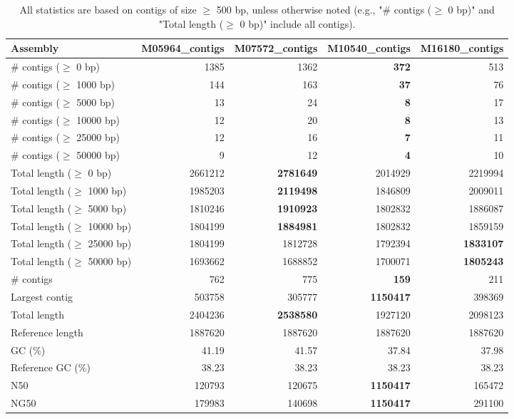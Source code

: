 \documentclass[12pt,a4paper]{article}
\begin{document}
\begin{table}[ht]
\begin{center}
\caption{All statistics are based on contigs of size $\geq$ 500 bp, unless otherwise noted (e.g., "\# contigs ($\geq$ 0 bp)" and "Total length ($\geq$ 0 bp)" include all contigs).}
\begin{tabular}{|l*{4}{|r}|}
\hline
Assembly & M05964\_contigs & M07572\_contigs & M10540\_contigs & M16180\_contigs \\ \hline
\# contigs ($\geq$ 0 bp) & 1385 & 1362 & {\bf 372} & 513 \\ \hline
\# contigs ($\geq$ 1000 bp) & 144 & 163 & {\bf 37} & 76 \\ \hline
\# contigs ($\geq$ 5000 bp) & 13 & 24 & {\bf 8} & 17 \\ \hline
\# contigs ($\geq$ 10000 bp) & 12 & 20 & {\bf 8} & 13 \\ \hline
\# contigs ($\geq$ 25000 bp) & 12 & 16 & {\bf 7} & 11 \\ \hline
\# contigs ($\geq$ 50000 bp) & 9 & 12 & {\bf 4} & 10 \\ \hline
Total length ($\geq$ 0 bp) & 2661212 & {\bf 2781649} & 2014929 & 2219994 \\ \hline
Total length ($\geq$ 1000 bp) & 1985203 & {\bf 2119498} & 1846809 & 2009011 \\ \hline
Total length ($\geq$ 5000 bp) & 1810246 & {\bf 1910923} & 1802832 & 1886087 \\ \hline
Total length ($\geq$ 10000 bp) & 1804199 & {\bf 1884981} & 1802832 & 1859159 \\ \hline
Total length ($\geq$ 25000 bp) & 1804199 & 1812728 & 1792394 & {\bf 1833107} \\ \hline
Total length ($\geq$ 50000 bp) & 1693662 & 1688852 & 1700071 & {\bf 1805243} \\ \hline
\# contigs & 762 & 775 & {\bf 159} & 211 \\ \hline
Largest contig & 503758 & 305777 & {\bf 1150417} & 398369 \\ \hline
Total length & 2404236 & {\bf 2538580} & 1927120 & 2098123 \\ \hline
Reference length & 1887620 & 1887620 & 1887620 & 1887620 \\ \hline
GC (\%) & 41.19 & 41.57 & 37.84 & 37.98 \\ \hline
Reference GC (\%) & 38.23 & 38.23 & 38.23 & 38.23 \\ \hline
N50 & 120793 & 120675 & {\bf 1150417} & 165472 \\ \hline
NG50 & 179983 & 140698 & {\bf 1150417} & 291100 \\ \hline

\end{tabular}
\end{center}
\end{table}
\end{document}
